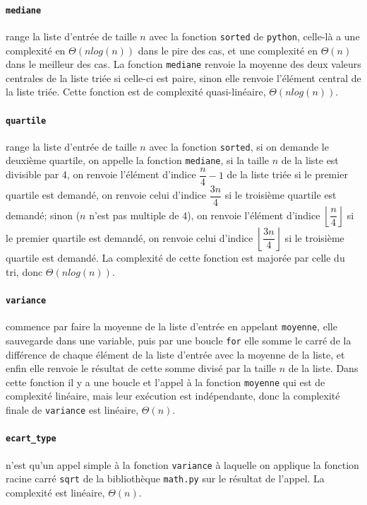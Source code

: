 \documentclass[12pt]{article}
\begin{document}
\paragraph{\texttt{mediane}} range la liste d'entrée de taille $n$ avec la fonction \texttt{sorted} de \texttt{python}, celle-là a une complexité en $\Theta(nlog(n))$ dans le pire des cas, et une complexité en $\Theta(n)$ dans le meilleur des cas. La fonction \texttt{mediane} renvoie la moyenne des deux valeurs centrales de la liste triée si celle-ci est paire, sinon elle renvoie l'élément central de la liste triée. Cette fonction est de complexité quasi-linéaire, $\Theta(nlog(n))$.
\paragraph{\texttt{quartile}} range la liste d'entrée de taille $n$ avec la fonction \texttt{sorted}, si on demande le deuxième quartile, on appelle la fonction \texttt{mediane}, si la taille $n$ de la liste est divisible par 4, on renvoie l'élément d'indice $\dfrac{n}{4}-1$ de la liste triée si le premier quartile est demandé, on renvoie celui d'indice $\dfrac{3n}{4}$ si le troisième quartile est demandé; sinon ($n$ n'est pas multiple de 4), on renvoie l'élément d'indice $\left\lfloor\dfrac{n}{4}\right\rfloor$ si le premier quartile est demandé, on renvoie celui d'indice $\left\lfloor\dfrac{3n}{4}\right\rfloor$ si le troisième quartile est demandé. La complexité de cette fonction est majorée par celle du tri, donc $\Theta(nlog(n))$.
\paragraph{\texttt{variance}} commence par faire la moyenne de la liste d'entrée en appelant \texttt{moyenne}, elle sauvegarde dans une variable, puis par une boucle \texttt{for} elle somme le carré de la différence de chaque élément de la liste d'entrée avec la moyenne de la liste, et enfin elle renvoie le résultat de cette somme divisé par la taille $n$ de la liste. Dans cette fonction il y a une boucle et l'appel à la fonction \texttt{moyenne} qui est de complexité linéaire, mais leur exécution est indépendante, donc la complexité finale de \texttt{variance} est linéaire, $\Theta(n)$.
\paragraph{\texttt{ecart\_type}} n'est qu'un appel simple à la fonction \texttt{variance} à laquelle on applique la fonction racine carré \texttt{sqrt} de la bibliothèque \texttt{math.py} sur le résultat de l'appel. La complexité est linéaire, $\Theta(n)$.
\end{document}
